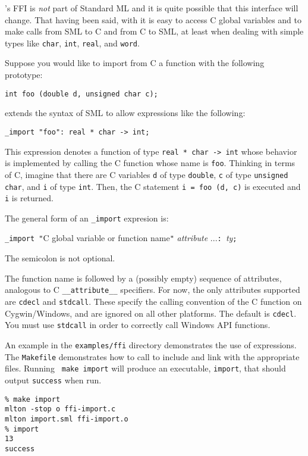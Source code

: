 %
{\mlton}'s FFI is {\em not} part of Standard ML and it is quite
possible that this interface will change.  That having been said, with
{\mlton} it is easy to access C global variables and to make calls
from SML to C and from C to SML, at least when dealing with simple
types like {\tt char}, {\tt int}, {\tt real}, and {\tt word}.
%

Suppose you would like to import from C a function with the following
prototype:
\begin{verbatim}
int foo (double d, unsigned char c);
\end{verbatim}
{\mlton} extends the syntax of SML to allow expressions like the following:
\begin{verbatim}
_import "foo": real * char -> int;
\end{verbatim}
This expression denotes a function of type {\tt real * char -> int}
whose behavior is implemented by calling the C function whose name is
{\tt foo}.  Thinking in terms of C, imagine that there are C
variables {\tt d} of type {\tt double}, {\tt c} of type {\tt unsigned
char}, and {\tt i} of type {\tt int}.  Then, the C statement
\mbox{\tt i = foo (d, c)} is executed and {\tt i} is returned.

The general form of an \verb+_import+ expresion is:
\begin{center}
{\tt \_import "}C global variable or function name{\tt "} {\it
attribute} ...{\tt : }{\it ty}{\tt ;}
\end{center}
The semicolon is not optional.

The function name is followed by a (possibly empty) sequence of
attributes, analogous to C {\tt\_\_attribute\_\_} specifiers.  For
now, the only attributes supported are {\tt cdecl} and {\tt stdcall}.
These specify the calling convention of the C function on
Cygwin/Windows, and are ignored on all other platforms.  The default
is {\tt cdecl}.  You must use {\tt stdcall} in order to correctly call
Windows API functions.

An example in the {\tt examples/ffi} directory demonstrates the use of
{} expressions.  The {\tt Makefile} demonstrates how to call
{\mlton} to include and link with the appropriate files.  Running {\tt
make import} will produce an executable, {\tt import}, that should
output {\tt success} when run.

\begin{verbatim}
% make import
mlton -stop o ffi-import.c
mlton import.sml ffi-import.o
% import
13
success
\end{verbatim}

